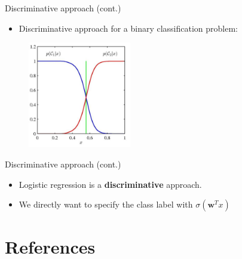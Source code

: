 \documentclass[serif, aspectratio=169]{beamer}
\begin{document}
\begin{frame}{Discriminative approach (cont.)}
    \begin{itemize}
        \item Discriminative approach for a binary classification problem:
    \end{itemize}
    \begin{figure}[h]
      \centering
      \includegraphics[width=0.4\textwidth]{pic/Disc.png}
      \end{figure}
    \vfill
\end{frame}
\begin{frame}{Discriminative approach (cont.)}
    \begin{itemize}
        \item Logistic regression is a \textbf{discriminative} approach.
        \item We directly want to specify the class label with $\sigma (\mathbf{w}^T x)$
    \end{itemize}
\end{frame}

\section{References}
\end{document}
